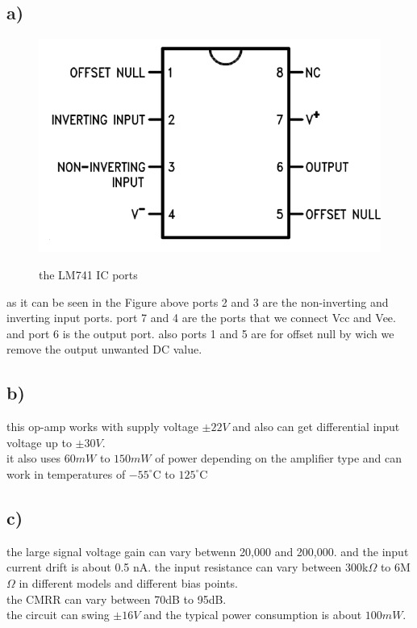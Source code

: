 \documentclass[11pt]{article}
\begin{document}
\subsection*{a)}
\begin{figure}[H]
    \begin{center}
        \includegraphics[scale=0.5]{Fig/LM741-IC.png}
        \label{fig:lm741IC}
        \caption{the LM741 IC ports}
    \end{center}
\end{figure}
as it can be seen in the Figure above ports 2 and 3 are the non-inverting and inverting
input ports. port 7 and 4 are the ports that we connect Vcc and Vee. and port 6 is the output port.
also ports 1 and 5 are for offset null by wich we remove the output unwanted DC value.
\subsection*{b)}
this op-amp works with supply voltage $\pm22V$ and also can get differential input voltage up to $\pm30V$. \\
it also uses $60mW$ to $150mW$ of power depending on the amplifier type and can work in temperatures of $-55^\circ \mathrm{C}$ to $125^\circ \mathrm{C}$
\subsection*{c)}
the large signal voltage gain can vary betwenn 20,000 and 200,000. and the input current drift is about 0.5 nA.
the input resistance can vary between 300k$\Omega$ to 6M$\Omega$ in different models and different bias points. \\
the CMRR can vary between 70dB to 95dB.\\
the circuit can swing $\pm16V$ and the typical power consumption is about $100mW$.
\end{document}
